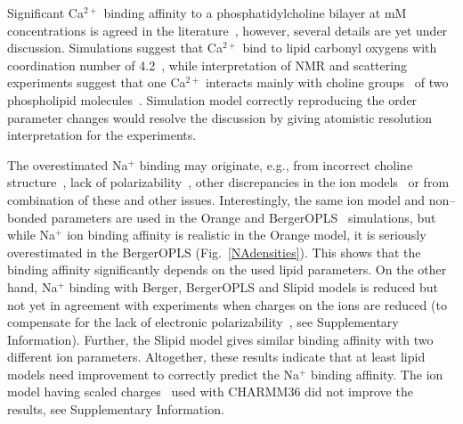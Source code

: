 \documentclass[pre,aps,floatfix,authordate1-4,twocolumn]{revtex4-1}
\begin{document}
Significant Ca$^{2+}$ binding affinity to a phosphatidylcholine bilayer at mM concentrations  
is agreed in the literature~\cite{akutsu81,altenbach84,cevc90,tocanne90}, however, several
details are yet under discussion. Simulations suggest that Ca$^{2+}$ bind to lipid carbonyl
oxygens with coordination number of 4.2~\cite{bockmann04}, while interpretation of NMR and 
scattering experiments suggest that one Ca$^{2+}$ interacts mainly with choline 
groups~\cite{hauser76,hauser78,herbette84} of two phospholipid molecules~\cite{altenbach84}. 
Simulation model correctly reproducing the order parameter changes would resolve the discussion
by giving atomistic resolution interpretation for the experiments.




The overestimated Na$^+$ binding may originate, e.g., from incorrect choline structure~\cite{botan15}, 
lack of polarizability~\cite{leontyev11}, other discrepancies in the ion models~\cite{hess06,chen07,Reif13} or from
combination of these and other issues. Interestingly, the same ion model and non--bonded parameters
are used in the Orange and BergerOPLS~\cite{tieleman06} simulations, but while Na$^+$ ion binding affinity
is realistic in the Orange model, it is seriously overestimated in the BergerOPLS (Fig.~\ref{NAdensities}). 
This shows that the binding affinity significantly depends on the used lipid parameters. 
On the other hand, Na$^+$ binding with Berger, BergerOPLS and Slipid models is reduced but not yet in agreement with experiments 
when charges on the ions are reduced (to compensate for the lack of electronic polarizability~\cite{kohagen15,leontyev11}, 
see Supplementary Information). 
Further, the Slipid model gives similar binding affinity with two different ion parameters. 
Altogether, these results indicate that at least lipid models need improvement to 
correctly predict the Na$^+$ binding affinity.
The ion model having scaled charges~\cite{kohagen14} used with CHARMM36 did not improve the results, see Supplementary Information.
\end{document}
